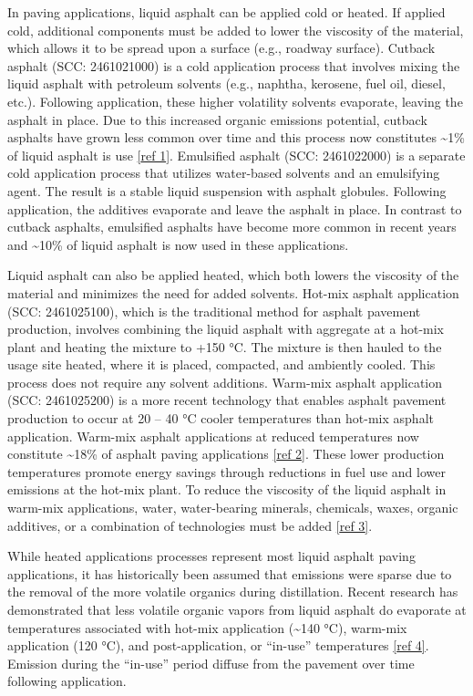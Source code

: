\documentclass[
  11pt,
  oneside]{book}
\begin{document}
In paving applications, liquid asphalt can be applied cold or heated. If applied cold, additional components must be added to lower the viscosity of the material, which allows it to be spread upon a surface (e.g., roadway surface). Cutback asphalt (SCC: 2461021000) is a cold application process that involves mixing the liquid asphalt with petroleum solvents (e.g., naphtha, kerosene, fuel oil, diesel, etc.). Following application, these higher volatility solvents evaporate, leaving the asphalt in place. Due to this increased organic emissions potential, cutback asphalts have grown less common over time and this process now constitutes \textasciitilde1\% of liquid asphalt is use \hyperref[ref-1]{{[}ref 1{]}}. Emulsified asphalt (SCC: 2461022000) is a separate cold application process that utilizes water-based solvents and an emulsifying agent. The result is a stable liquid suspension with asphalt globules. Following application, the additives evaporate and leave the asphalt in place. In contrast to cutback asphalts, emulsified asphalts have become more common in recent years and \textasciitilde10\% of liquid asphalt is now used in these applications.

Liquid asphalt can also be applied heated, which both lowers the viscosity of the material and minimizes the need for added solvents. Hot-mix asphalt application (SCC: 2461025100), which is the traditional method for asphalt pavement production, involves combining the liquid asphalt with aggregate at a hot-mix plant and heating the mixture to +150 °C. The mixture is then hauled to the usage site heated, where it is placed, compacted, and ambiently cooled. This process does not require any solvent additions. Warm-mix asphalt application (SCC: 2461025200) is a more recent technology that enables asphalt pavement production to occur at 20 -- 40 °C cooler temperatures than hot-mix asphalt application. Warm-mix asphalt applications at reduced temperatures now constitute \textasciitilde18\% of asphalt paving applications \hyperref[ref-2]{{[}ref 2{]}}. These lower production temperatures promote energy savings through reductions in fuel use and lower emissions at the hot-mix plant. To reduce the viscosity of the liquid asphalt in warm-mix applications, water, water-bearing minerals, chemicals, waxes, organic additives, or a combination of technologies must be added \hyperref[ref-3]{{[}ref 3{]}}.

While heated applications processes represent most liquid asphalt paving applications, it has historically been assumed that emissions were sparse due to the removal of the more volatile organics during distillation. Recent research has demonstrated that less volatile organic vapors from liquid asphalt do evaporate at temperatures associated with hot-mix application (\textasciitilde140 °C), warm-mix application (120 °C), and post-application, or ``in-use'' temperatures \hyperref[ref-4]{{[}ref 4{]}}. Emission during the ``in-use'' period diffuse from the pavement over time following application.
\end{document}
